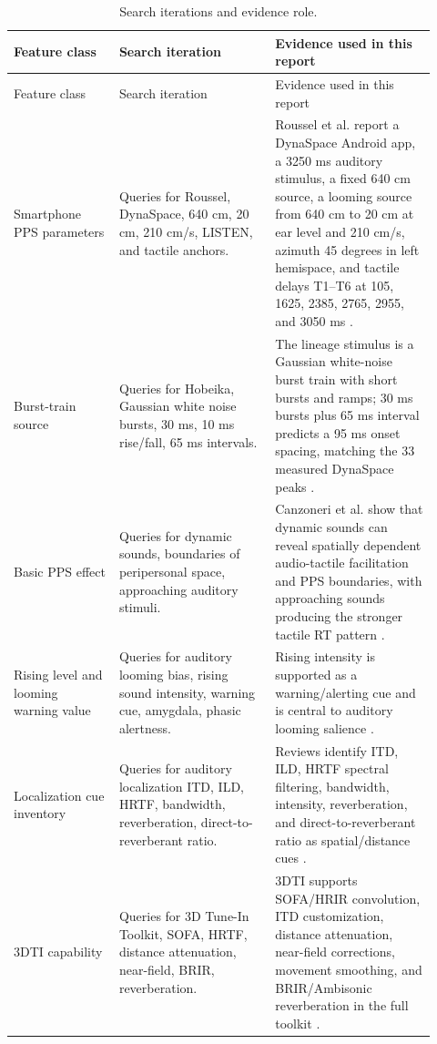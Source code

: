 \documentclass[10pt]{article}
\begin{document}
\begin{longtable}{P{0.23\linewidth} P{0.34\linewidth} P{0.35\linewidth}}
\caption{Search iterations and evidence role.}\\
\toprule
Feature class & Search iteration & Evidence used in this report\\
\midrule
\endfirsthead
\toprule
Feature class & Search iteration & Evidence used in this report\\
\midrule
\endhead
Smartphone PPS parameters & Queries for Roussel, DynaSpace, 640 cm, 20 cm, 210 cm/s, LISTEN, and tactile anchors. & Roussel et al. report a DynaSpace Android app, a 3250 ms auditory stimulus, a fixed 640 cm source, a looming source from 640 cm to 20 cm at ear level and 210 cm/s, azimuth 45 degrees in left hemispace, and tactile delays T1--T6 at 105, 1625, 2385, 2765, 2955, and 3050 ms \cite{roussel2025}.\\
Burst-train source & Queries for Hobeika, Gaussian white noise bursts, 30 ms, 10 ms rise/fall, 65 ms intervals. & The lineage stimulus is a Gaussian white-noise burst train with short bursts and ramps; 30 ms bursts plus 65 ms interval predicts a 95 ms onset spacing, matching the 33 measured DynaSpace peaks \cite{hobeika2020}.\\
Basic PPS effect & Queries for dynamic sounds, boundaries of peripersonal space, approaching auditory stimuli. & Canzoneri et al. show that dynamic sounds can reveal spatially dependent audio-tactile facilitation and PPS boundaries, with approaching sounds producing the stronger tactile RT pattern \cite{canzoneri2012}.\\
Rising level and looming warning value & Queries for auditory looming bias, rising sound intensity, warning cue, amygdala, phasic alertness. & Rising intensity is supported as a warning/alerting cue and is central to auditory looming salience \cite{bach2008,neuhoff2016}.\\
Localization cue inventory & Queries for auditory localization ITD, ILD, HRTF, bandwidth, reverberation, direct-to-reverberant ratio. & Reviews identify ITD, ILD, HRTF spectral filtering, bandwidth, intensity, reverberation, and direct-to-reverberant ratio as spatial/distance cues \cite{carlini2024,kolarik2016}.\\
3DTI capability & Queries for 3D Tune-In Toolkit, SOFA, HRTF, distance attenuation, near-field, BRIR, reverberation. & 3DTI supports SOFA/HRIR convolution, ITD customization, distance attenuation, near-field corrections, movement smoothing, and BRIR/Ambisonic reverberation in the full toolkit \cite{cuevas2019}.\\

\end{longtable}
\end{document}
